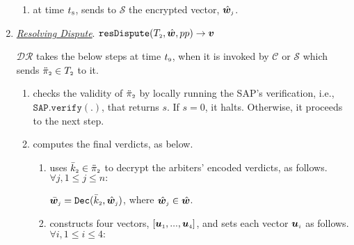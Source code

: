 \begin{enumerate}
\begin{enumerate}
\item at time $t_{\scriptscriptstyle 8}$, sends to $\mathcal S$ the encrypted vector, $\hat {\bm w}_{\scriptscriptstyle j}$. %
\end{enumerate}


\vspace{2mm}
\item\label{DR::DisputeResolution}  \underline{\textit{Resolving Dispute}}. $\mathtt{resDispute}(T_{\scriptscriptstyle 2}, \hat {\bm w}, pp)\rightarrow \bm v$



 $\mathcal{DR}$ takes the below steps at time $t_{\scriptscriptstyle 9}$, when it is invoked by $\mathcal{C}$ or  $\mathcal{S}$ which sends $\ddot\pi_{\scriptscriptstyle 2}\in T_{\scriptscriptstyle 2}$ to it.

\begin{enumerate}
%
\item checks the validity of $\ddot{\pi}_{\scriptscriptstyle 2}$ by locally running  the SAP's verification, i.e., $\mathtt{SAP.verify}(.)$, that  returns  $s$. If $s=0$, it halts. Otherwise, it proceeds to the next step. 
%
%
%

\item computes the final verdicts, as below. 
%
\begin{enumerate}
%
\item uses $\bar k_{\scriptscriptstyle 2}\in \ddot \pi_{\scriptscriptstyle 2}$ to decrypt the arbiters' encoded verdicts, as follows. $ \forall j, 1\leq j \leq n:$

$ \bar {\bm w}_{\scriptscriptstyle j}= \mathtt{Dec}(\bar k_{\scriptscriptstyle 2}, \hat{\bm w}_{\scriptscriptstyle j})$, where $\hat{\bm w}_{\scriptscriptstyle j}\in \hat{\bm w}$.
 \item constructs four vectors, $[\bm u_{\scriptscriptstyle 1},...,\bm u_{\scriptscriptstyle 4}]$, and sets  each vector $\bm u_{\scriptscriptstyle i}$ as follows. $\forall i, 1\leq i \leq 4:$
 

\end{enumerate}
\end{enumerate}
\end{enumerate}
